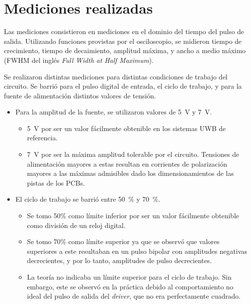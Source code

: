 \section{Mediciones realizadas}

Las mediciones consistieron en mediciones en el dominio del tiempo del pulso de
salida. Utilizando funciones provistas por el osciloscopio, se midieron tiempo
de crecimiento, tiempo de decaimiento, amplitud máxima, y ancho a medio máximo
(FWHM del inglés \textit{Full Width at Half Maximum}).

Se realizaron distintas mediciones para distintas condiciones de trabajo del
circuito. Se barrió para el pulso digital de entrada, el ciclo de trabajo, y
para la fuente de alimentación distintos valores de tensión.

\begin{itemize}
    \item Para la amplitud de la fuente, se utilizaron valores de \qty{5}{\volt} y
        \qty{7}{\volt}.
        \begin{itemize}
            \item \qty{5}{\volt} por ser un valor fácilmente obtenible en los
                sistemas {UWB} de referencia.
            \item \qty{7}{\volt} por ser la máxima amplitud tolerable por el circuito.
                Tensiones de alimentación mayores a estas resultan en corrientes de
                polarización mayores a las máximas admisibles dado los
                dimensionamientos de las pistas de los {PCBs}.
        \end{itemize}
    \item El ciclo de trabajo se barrió entre \qty{50}{\percent} y
        \qty{70}{\percent}.
        \begin{itemize}
            \item Se tomo 50\% como límite inferior por ser un valor fácilmente
                obtenible como división de un reloj digital.
            \item Se tomo 70\% como límite superior ya que se observó que valores
                superiores a este resultaban en un pulso bipolar con amplitudes
                negativas decrecientes, y por lo tanto, amplitudes de pulso
                decrecientes.
            \item La teoría no indicaba un límite superior para el ciclo de
                trabajo. Sin embargo, este se observó en la práctica debido al
                comportamiento no ideal del pulso de salida del \emph{driver},
                que no era perfectamente cuadrado.
        \end{itemize}
\end{itemize}

